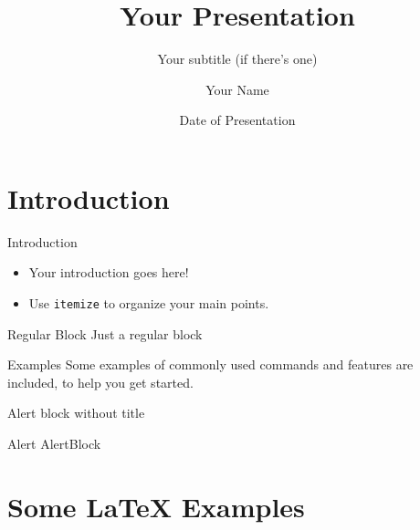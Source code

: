 \documentclass[9pt,xcolor={table,dvipsnames},t,aspectratio=169,onlytextwidth,mathserif]{beamer}
\title[Your Short Title]{Your Presentation}
\subtitle{Your subtitle (if there's one)}
\author{Your Name}
\institute{Your Faculty/Department}
\date{Date of Presentation}
\begin{document}
\begin{frame}
  \titlepage
\end{frame}


\section{Introduction}

\begin{frame}{Introduction}

\begin{itemize}
  \item Your introduction goes here!
  \item Use \texttt{itemize} to organize your main points.
\end{itemize}

\begin{block}{Regular Block}
Just a regular block
\end{block}

\begin{exampleblock}{Examples}
Some examples of commonly used commands and features are included, to help you get started.
\end{exampleblock}

\begin{alertblock}{}
Alert block without title
\end{alertblock}

\begin{alertblock}{Alert}
    AlertBlock
\end{alertblock}

\end{frame}

\section{Some \LaTeX{} Examples}
\end{document}
